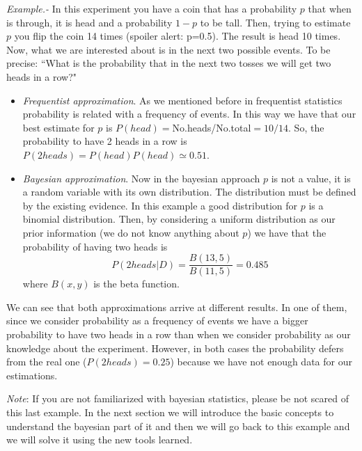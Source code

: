 \documentclass[onecolumn,           %
               showpacs,            %
               preprintnumbers,     %
               aps,                 %
               prl,          	    %
               letterpaper,             %
               superscriptaddress,      %
               nofootinbib,         %
               tightenlines,        %
               floats,floatfix      %
               ,usenatbib,
               ]{revtex4-1}
\begin{document}
\textit{Example.-} In this experiment  you have a coin that has a probability $p$ that when is through, it is head and a probability $1-p$ to be tall. Then, trying to estimate $p$ you flip the coin 14 times (spoiler alert: p=0.5). The result is head 10 times. Now, what we are interested about is in the next two possible events. To be precise: ``What is the probability that in the next two tosses we will get two heads in a row?"
\begin{itemize}
\item \textit{Frequentist approximation}. As we mentioned before in frequentist statistics probability is related with a frequency of events. In this way we have that our best estimate for $p$ is $P(head)=$No.heads/No.total$=10/14$. So, the probability to have 2 heads in a row is $P(2heads)=P(head)P(head)\simeq 0.51$.  
\item \textit{Bayesian approximation}. Now in the bayesian approach $p$ is not a value, it is a random variable with its own distribution. The distribution must be defined by the existing evidence. In this example a good distribution for $p$ is a binomial distribution. Then, by considering a uniform distribution as our prior information (we do not know anything about $p$) we have that the probability of having two heads is
\[
P(2heads|D)=\frac{B(13,5)}{B(11,5)}=0.485
\]
where $B(x,y)$ is the beta function.
\end{itemize}

We can see that both approximations arrive at different results. In one of them, since we consider probability as a frequency of events we have a bigger probability to have two heads in a row than when we consider probability as our knowledge about the experiment. However, in both cases the probability defers from the real one ($P(2heads)=0.25$) because we have not enough data for our estimations.

\textit{Note}: If you are not familiarized with bayesian statistics,  please be not scared of this last example. In the next section we will introduce the basic concepts to understand the bayesian part of it and then we will go back to this example and we will solve it using the new tools learned.   


\end{document}
